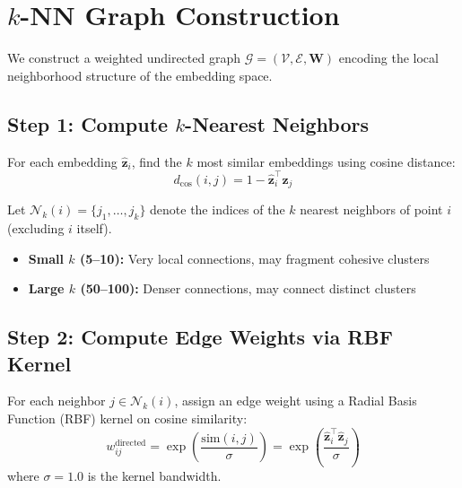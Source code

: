\documentclass[11pt,a4paper]{article}
\newcommand{\vect}[1]{\mathbf{#1}}
\newcommand{\mat}[1]{\mathbf{#1}}
\newcommand{\set}[1]{\mathcal{#1}}
\begin{document}
\section{$k$-NN Graph Construction}

We construct a weighted undirected graph $\set{G} = (\set{V}, \set{E}, \mat{W})$ encoding the local neighborhood structure of the embedding space.

\subsection{Step 1: Compute $k$-Nearest Neighbors}

For each embedding $\hat{\vect{z}}_i$, find the $k$ most similar embeddings using cosine distance:
\begin{equation}
    d_{\cos}(i, j) = 1 - \hat{\vect{z}}_i^\top \hat{\vect{z}}_j
\end{equation}

Let $\set{N}_k(i) = \{j_1, \ldots, j_k\}$ denote the indices of the $k$ nearest neighbors of point $i$ (excluding $i$ itself).

\begin{tcolorbox}[colback=blue!5,colframe=blue!40!black,title=Intuition: Effect of $k$]
\begin{itemize}
    \item \textbf{Small $k$ (5--10):} Very local connections, may fragment cohesive clusters
    \item \textbf{Large $k$ (50--100):} Denser connections, may connect distinct clusters
\end{itemize}
\end{tcolorbox}

\subsection{Step 2: Compute Edge Weights via RBF Kernel}

For each neighbor $j \in \set{N}_k(i)$, assign an edge weight using a Radial Basis Function (RBF) kernel on cosine similarity:
\begin{equation}
    w_{ij}^{\text{directed}} = \exp\left(\frac{\text{sim}(i,j)}{\sigma}\right) = \exp\left(\frac{\hat{\vect{z}}_i^\top \hat{\vect{z}}_j}{\sigma}\right)
\end{equation}
where $\sigma = 1.0$ is the kernel bandwidth.
\end{document}
